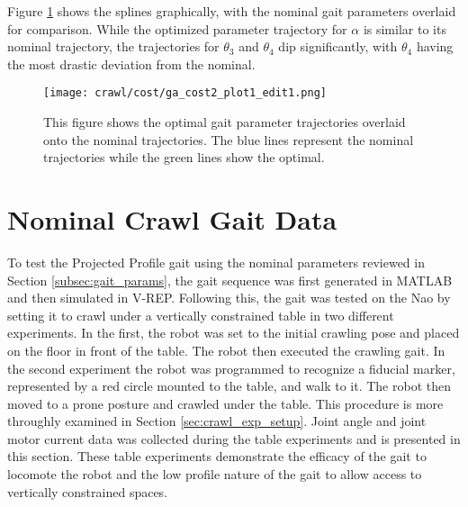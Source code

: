 Figure \ref{fig:optimal_gait_parameters} shows the splines graphically, with the nominal gait parameters
overlaid for comparison. While the optimized parameter trajectory for $\alpha$ is similar to its nominal
trajectory, the trajectories for $\theta_3$ and $\theta_4$ dip significantly, with $\theta_4$ having the
most drastic deviation from the nominal.

\begin{figure}
  \centerline{
    \texttt{[image: crawl/cost/ga\_cost2\_plot1\_edit1.png]}
  }
  \caption{This figure shows the optimal gait parameter trajectories overlaid onto the nominal
           trajectories. The blue lines represent the nominal trajectories while the green
           lines show the optimal.}
  \label{fig:optimal_gait_parameters}
\end{figure}




\FloatBarrier
\section{Nominal Crawl Gait Data} \label{sec:nom_crawl_data}

To test the Projected Profile gait using the nominal parameters reviewed in 
Section \ref{subsec:gait_params}, the gait sequence was first generated in
MATLAB and then simulated in V-REP. Following this, the gait was tested on the
Nao by setting it to crawl under a vertically constrained table in two different
experiments. In the first, the robot was set to the initial crawling pose and
placed on the floor in front of the table. The robot then executed the crawling gait.
In the second experiment the robot was programmed to recognize a fiducial marker,
represented by a red circle mounted to the table, and walk to it. 
The robot then moved to a prone posture and crawled under the table. This procedure
is more throughly examined in Section \ref{sec:crawl_exp_setup}. Joint angle and joint
motor current data was collected during the table experiments and is presented in this section.
These table experiments demonstrate the efficacy of the gait to locomote the robot
and the low profile nature of the gait to allow access to vertically constrained spaces.

